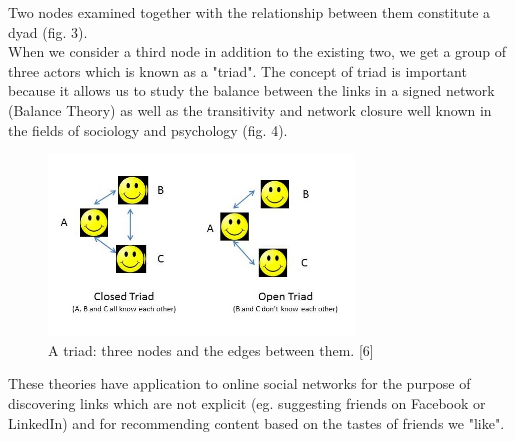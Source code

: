 \documentclass[conference,letterpaper]{IEEEtran}
\begin{document}
Two nodes examined together with the relationship between them constitute a dyad (fig. 3). \\
When we consider a third node in addition to the existing two, we get a group of three actors which is known 
as a "triad". The concept of triad is important because it allows us to study the balance between the links in a
signed network (Balance Theory) as well as the transitivity and network closure well known in the fields of
sociology and psychology (fig. 4).\\
\begin{center}
\begin{figure}[hb]
\centering
\includegraphics[width=3.2in]{open-triad}
\caption{
A triad: three nodes and the edges between them. [6]
}
\label{fig_sim4}
\end{figure}
\end{center}
These theories have application to online social networks for the purpose of discovering links which are not
explicit (eg. suggesting friends on Facebook or LinkedIn) and for recommending content based on the tastes of friends we "like".\\
\end{document}

